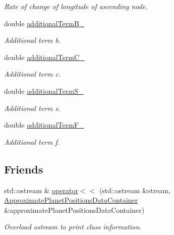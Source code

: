 \begin{DoxyCompactItemize}
\begin{DoxyCompactList}\small\item\em Rate of change of longitude of ascending node. \end{DoxyCompactList}\item 
double \hyperlink{structtudat_1_1ephemerides_1_1ApproximatePlanetPositionsDataContainer_a447ede4724a8672f110ea685fd8a7ea5}{additional\+Term\+B\+\_\+}
\begin{DoxyCompactList}\small\item\em Additional term b. \end{DoxyCompactList}\item 
double \hyperlink{structtudat_1_1ephemerides_1_1ApproximatePlanetPositionsDataContainer_a5b45c04ec7348046da355253127bf936}{additional\+Term\+C\+\_\+}
\begin{DoxyCompactList}\small\item\em Additional term c. \end{DoxyCompactList}\item 
double \hyperlink{structtudat_1_1ephemerides_1_1ApproximatePlanetPositionsDataContainer_adf8e8ebd02b232dbc34b00a576aec60d}{additional\+Term\+S\+\_\+}
\begin{DoxyCompactList}\small\item\em Additional term s. \end{DoxyCompactList}\item 
double \hyperlink{structtudat_1_1ephemerides_1_1ApproximatePlanetPositionsDataContainer_a66a6e79e153d59f4d2ef1e6e6e7bbd36}{additional\+Term\+F\+\_\+}
\begin{DoxyCompactList}\small\item\em Additional term f. \end{DoxyCompactList}\end{DoxyCompactItemize}
\subsection*{Friends}
\begin{DoxyCompactItemize}
\item 
std\+::ostream \& \hyperlink{structtudat_1_1ephemerides_1_1ApproximatePlanetPositionsDataContainer_a17869ed932a229807f45d799c2d83913}{operator$<$$<$} (std\+::ostream \&stream, \hyperlink{structtudat_1_1ephemerides_1_1ApproximatePlanetPositionsDataContainer}{Approximate\+Planet\+Positions\+Data\+Container} \&approximate\+Planet\+Positions\+Data\+Container)
\begin{DoxyCompactList}\small\item\em Overload ostream to print class information. \end{DoxyCompactList}\end{DoxyCompactItemize}


